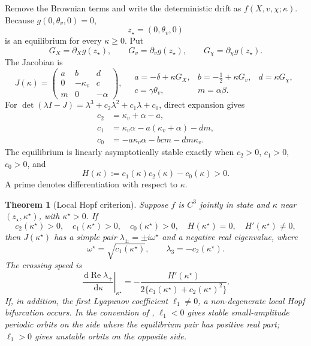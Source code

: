 \documentclass[11pt]{article}
\newcommand{\dd}{\,\mathrm{d}}
\newtheorem{theorem}{Theorem}
\begin{document}
Remove the Brownian terms and write the deterministic drift as $f(X,v,\chi;\kappa)$.
Because $g(0,\theta_v,0)=0$,
\begin{equation}
z_\star=(0,\theta_v,0) \label{eq:fixed-equilibrium}
\end{equation}
is an equilibrium for every $\kappa\geq0$.  Put
\[
G_X=\partial_X g(z_\star),\qquad
G_v=\partial_v g(z_\star),\qquad
G_\chi=\partial_\chi g(z_\star).
\]
The Jacobian is
\begin{equation}
J(\kappa)=
\begin{pmatrix}
a&b&d\\
0&-\kappa_v&c\\
m&0&-\alpha
\end{pmatrix},
\quad
\begin{matrix}
a=-\delta+\kappa G_X,& b=-\tfrac12+\kappa G_v,& d=\kappa G_\chi,\\
c=\gamma\theta_v,&m=\alpha\beta.&
\end{matrix} \label{eq:jacobian}
\end{equation}
For
$\det(\lambda I-J)=\lambda^3+c_2\lambda^2+c_1\lambda+c_0$, direct expansion gives
\begin{align}
c_2&=\kappa_v+\alpha-a,\label{eq:c2}\\
c_1&=\kappa_v\alpha-a(\kappa_v+\alpha)-dm,\label{eq:c1}\\
c_0&=-a\kappa_v\alpha-bcm-dm\kappa_v.\label{eq:c0}
\end{align}
The equilibrium is linearly asymptotically stable exactly when
$c_2>0$, $c_1>0$, $c_0>0$, and
\begin{equation}
H(\kappa):=c_1(\kappa)c_2(\kappa)-c_0(\kappa)>0. \label{eq:rh}
\end{equation}
A prime denotes differentiation with respect to $\kappa$.

\begin{samepage}
\begin{theorem}[Local Hopf criterion]
\label{thm:hopf}
Suppose $f$ is $C^3$ jointly in state and $\kappa$ near
$(z_\star,\kappa^\star)$, with $\kappa^\star>0$.  If
\begin{equation}
c_2(\kappa^\star)>0,\quad c_1(\kappa^\star)>0,\quad
c_0(\kappa^\star)>0,\quad H(\kappa^\star)=0,\quad
H'(\kappa^\star)\neq0, \label{eq:hopf-conditions}
\end{equation}
then $J(\kappa^\star)$ has a simple pair
$\lambda_\pm=\pm i\omega^\star$ and a negative real eigenvalue, where
\[
\omega^\star=\sqrt{c_1(\kappa^\star)},
\qquad \lambda_3=-c_2(\kappa^\star).
\]
The crossing speed is
\begin{equation}
\left.\frac{\dd\operatorname{Re}\lambda_+}{\dd\kappa}\right|_{\kappa^\star}
=-\frac{H'(\kappa^\star)}
{2\{c_1(\kappa^\star)+c_2(\kappa^\star)^2\}}. \label{eq:transversality}
\end{equation}
If, in addition, the first Lyapunov coefficient $\ell_1\neq0$, a non-degenerate
local Hopf bifurcation occurs.  In the convention of \citet{kuznetsov2004},
$\ell_1<0$ gives stable small-amplitude periodic orbits on the side where the
equilibrium pair has positive real part; $\ell_1>0$ gives unstable orbits on the
opposite side.
\end{theorem}
\end{samepage}
\end{document}

